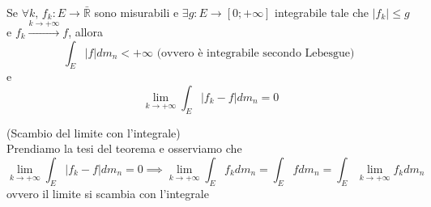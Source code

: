 \begin{theorem} \hspace{1cm} \\
	Se $\forall k, \, f_k: E \to \bar{\mathbb{R}}$ sono misurabili e $\exists g: E \to [0; +\infty]$ integrabile tale che $|f_k| \leq g$ e $f_k \stackrel{k \to +\infty}{\to} f$, allora
	$$
	\int_E |f|dm_n < +\infty \text{ (ovvero è integrabile secondo Lebesgue) }
	$$
	e
	\begin{equation}
		\lim_{k \to +\infty} \int_E |f_k - f| dm_n = 0
	\end{equation}
\end{theorem}
\begin{remark}(Scambio del limite con l'integrale) \\
	Prendiamo la tesi del teorema e osserviamo che
	$$
	\lim_{k \to +\infty} \int_E |f_k - f| dm_n = 0 \implies \lim_{k \to +\infty} \int_E f_k dm_n = \int_E f dm_n = \int_E \lim_{k \to +\infty} f_k dm_n
	$$
	ovvero il limite si scambia con l'integrale
\end{remark}
